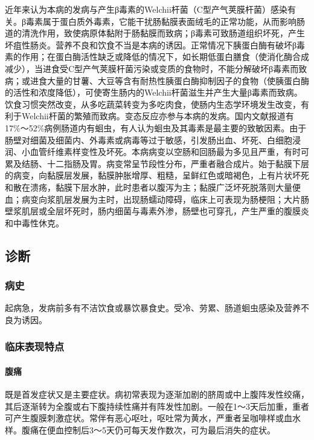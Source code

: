 近年来认为本病的发病与产生β毒素的Welchii杆菌（C型产气荚膜杆菌）感染有关。β毒素属于蛋白质外毒素，它能干扰肠黏膜表面绒毛的正常功能，从而影响肠道的清洗作用，致使病原体黏附于肠黏膜而致病；β毒素可致肠道组织坏死，产生坏疽性肠炎。营养不良和饮食不当是本病的诱因。正常情况下胰蛋白酶有破坏β毒素的作用；在蛋白酶活性缺乏或降低的情况下，如长期低蛋白膳食（使消化酶合成减少），当进食受C型产气荚膜杆菌污染或变质的食物时，不能分解破坏β毒素而致病；或进食大量的甘薯、大豆等含有耐热性胰蛋白酶抑制因子的食物（使胰蛋白酶的活性和浓度降低），可使寄生肠内的Welchii杆菌滋生并产生大量β毒素而致病。饮食习惯突然改变，从多吃蔬菜转变为多吃肉食，使肠内生态学环境发生改变，有利于Welchii杆菌的繁殖而致病。变态反应亦参与本病的发病。国内文献报道有17\%～52\%病例肠道内有蛔虫，有人认为蛔虫及其毒素是最主要的致敏因素。由于肠壁对细菌及细菌内、外毒素或病毒等过于敏感，引发肠出血、坏死、白细胞浸润、小血管纤维素样变性及坏死。本病病变以空肠和回肠最为多见且严重，有时可累及结肠、十二指肠及胃。病变常呈节段性分布，严重者融合成片。始于黏膜下层的病变，向黏膜层发展，黏膜肿胀增厚、粗糙，呈鲜红色或暗褐色，上有片状坏死和散在溃疡，黏膜下层水肿，此时患者以腹泻为主；黏膜广泛坏死脱落则大量便血；病变向浆肌层发展为主时，出现肠蠕动障碍，临床上可表现为肠梗阻；大片肠壁浆肌层或全层坏死时，肠内细菌与毒素外渗，肠壁也可穿孔，产生严重的腹膜炎和中毒性休克。

\subsection{诊断}

\subsubsection{病史}

起病急，发病前多有不洁饮食或暴饮暴食史。受冷、劳累、肠道蛔虫感染及营养不良为诱因。

\subsubsection{临床表现特点}

\paragraph{腹痛}

既是首发症状又是主要症状。病初常表现为逐渐加剧的脐周或中上腹阵发性绞痛，其后逐渐转为全腹或右下腹持续性痛并有阵发性加剧。一般在1～3天后加重，重者可产生腹膜刺激症状。常伴有恶心呕吐，呕吐常为黄水，严重者呈咖啡样或血水样。腹痛在便血控制后3～5天仍可每天发作数次，可为最后消失的症状。


